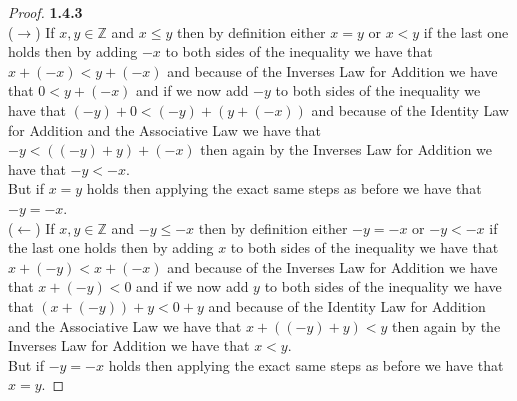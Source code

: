 \documentclass[11pt]{article}
\newcommand{\Z}{\mathbb{Z}}
\theoremstyle{definition}
\begin{document}
    \begin{proof}{\textbf{1.4.3}}\\
        ($\rightarrow$) If $x,y\in\Z$ and $x \leq y$ then by definition either $x=y$ or
        $x<y$ if the last one holds then by adding $-x$ to both sides of the inequality
        we have that $x+(-x)<y+(-x)$ and because of the Inverses Law for Addition we
        have that $0 < y+(-x)$ and if we now add $-y$ to both sides of the inequality
        we have that $(-y)+0<(-y)+(y+(-x))$ and because of the Identity Law for Addition
        and the Associative Law we have that $-y < ((-y)+y)+(-x)$ then again by the
        Inverses Law for Addition we have that $-y < -x$.\\
        But if $x=y$ holds then applying the exact same steps as before we have that
        $-y=-x$.\\
        ($\leftarrow$) If $x,y\in\Z$ and $-y \leq -x$ then by definition either $-y=-x$ or
        $-y<-x$ if the last one holds then by adding $x$ to both sides of the inequality
        we have that $x+(-y)<x+(-x)$ and because of the Inverses Law for Addition we
        have that $x+(-y)< 0$ and if we now add $y$ to both sides of the inequality
        we have that $(x+(-y))+y<0+y$ and because of the Identity Law for Addition
        and the Associative Law we have that $x + ((-y)+y) < y$ then again by the
        Inverses Law for Addition we have that $x < y$.\\
        But if $-y=-x$ holds then applying the exact same steps as before we have that
        $x=y$.
    \end{proof}
\end{document}
